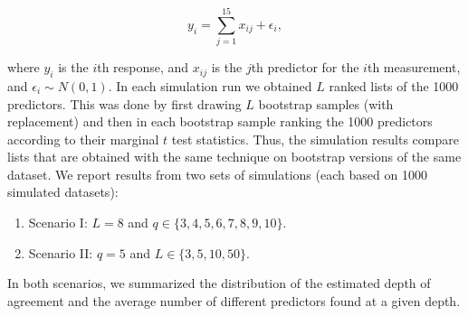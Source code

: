 \documentclass[12pt,a4paper]{article}
\theoremstyle{plain}
\begin{document}
$$y_i = \sum_{j=1}^{15}x_{ij} + \epsilon_i,$$

where $y_i$ is the $i$th response, and $x_{ij}$ is the $j$th predictor
for the $i$th measurement, and $\epsilon_i\sim N(0, 1)$. In each
simulation run we obtained \(L\) ranked lists of the 1000 predictors.
This was done by first drawing \(L\) bootstrap samples (with
replacement) and then in each bootstrap sample ranking the 1000
predictors according to their marginal $t$ test statistics. Thus, the
simulation results compare lists that are obtained with the same
technique on bootstrap versions of the same dataset. We report results
from two sets of simulations (each based on 1000 simulated datasets):
\begin{enumerate}
\item[] Scenario I: \(L=8\) and $q\in\{3,4,5,6,7,8,9,10\}$.
\item[] Scenario II: \(q=5\) and $L\in\{3,5,10,50\}$.
\end{enumerate}
In both scenarios, we summarized the distribution of the estimated
depth of agreement and the average number of different predictors
found at a given depth.
\end{document}

